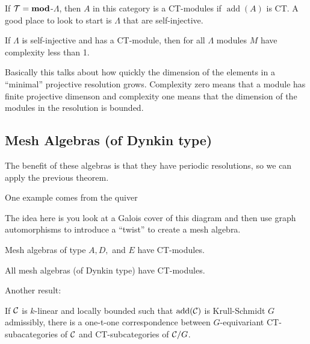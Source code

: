 \documentclass[12pt]{article}
\begin{document}
If $\mathcal{T}=\mathbf{mod}$-$\Lambda$, then $A$ in this category is a CT-modules if $\operatorname{add}(A)$ is CT.
A good place to look to start is $\Lambda$ that are self-injective.

\begin{thm}
	If $\Lambda$ is self-injective and has a CT-module, then for all $\Lambda$ modules $M$ have complexity less than 1. 
\end{thm}
\begin{rmk}
	Basically this talks about how quickly the dimension of the elements in a ``minimal'' projective resolution grows. Complexity zero means that a module has finite 
	projective dimenson and complexity one means that the dimension of the modules in the resolution is bounded.
\end{rmk}

\subsection{Mesh Algebras (of Dynkin type)}
The benefit of these algebras is that they have periodic resolutions, so we can apply the previous theorem.

One example comes from the quiver 
\begin{center}
\end{center}

The idea here is you look at a Galois cover of this diagram and then use graph automorphisms to introduce a ``twist'' to 
create a mesh algebra. 

\begin{thm}
	Mesh algebras of type $A,D,$ and $E$ have CT-modules.
\end{thm}
\begin{thm}
	All mesh algebras (of Dynkin type) have CT-modules.
\end{thm}

Another result:
\begin{thm}
	If $\mathcal{C}$ is $k$-linear and locally bounded such that $\operatorname{add}(\mathcal{C})$ is Krull-Schmidt $G$ admissibly,
	there is a one-t-one correspondence between $G$-equivariant CT-subacategories of $\mathcal{C}$ and CT-subcategories of $\mathcal{C}/G$.
\end{thm}
\end{document}
